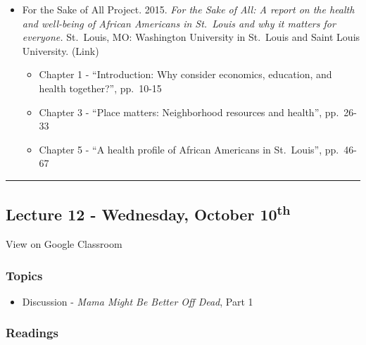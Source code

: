 \documentclass[]{book}
\providecommand{\tightlist}{%
  \setlength{\itemsep}{0pt}\setlength{\parskip}{0pt}}
\theoremstyle{definition}
\theoremstyle{definition}
\theoremstyle{definition}
\theoremstyle{remark}
\begin{document}
\begin{itemize}
\tightlist
\item
  For the Sake of All Project. 2015. \emph{For the Sake of All: A report
  on the health and well-being of African Americans in St.~Louis and why
  it matters for everyone.} St.~Louis, MO: Washington University in
  St.~Louis and Saint Louis University. (Link)

  \begin{itemize}
  \tightlist
  \item
    Chapter 1 - ``Introduction: Why consider economics, education, and
    health together?'', pp.~10-15
  \item
    Chapter 3 - ``Place matters: Neighborhood resources and health'',
    pp.~26-33
  \item
    Chapter 5 - ``A health profile of African Americans in St.~Louis'',
    pp.~46-67
  \end{itemize}
\end{itemize}

\begin{center}\rule{0.5\linewidth}{\linethickness}\end{center}

\hypertarget{lecture-12---wednesday-october-10th}{%
\subsection*{\texorpdfstring{Lecture 12 - Wednesday, October
10\textsuperscript{th}}{Lecture 12 - Wednesday, October 10th}}\label{lecture-12---wednesday-october-10th}}

View on Google Classroom

\hypertarget{topics-13}{%
\subsubsection*{Topics}\label{topics-13}}

\begin{itemize}
\tightlist
\item
  Discussion - \emph{Mama Might Be Better Off Dead}, Part 1
\end{itemize}

\hypertarget{readings-12}{%
\subsubsection*{Readings}\label{readings-12}}
\end{document}
